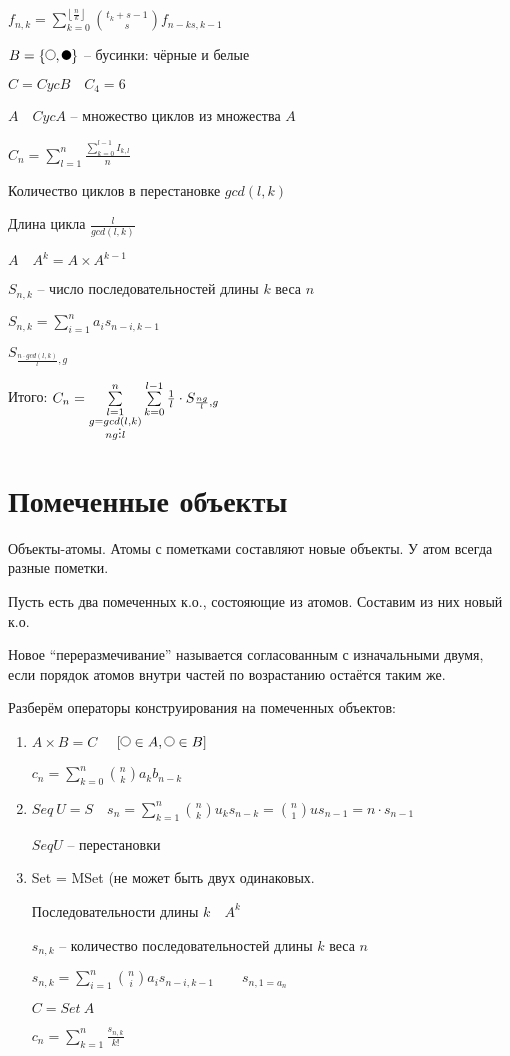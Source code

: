 \documentclass{book}
\theoremstyle{definition}
\begin{document}
$f_{n,k} = \sum_{k=0}^{\left\lfloor \frac{n}{k} \right\rfloor} {{t_k+s-1} \choose s}f_{n-ks,k-1}$


$B = \{\tikz \draw (0,0) circle [radius=.12];, \tikz \fill[black] (0,0) circle [radius=.12];\}$ -- бусинки: чёрные и белые 

$C = Cyc B\quad C_4 = 6$

$A\quad Cyc A$ -- множество циклов из множества  $A$

$C_n = \sum_{l=1}^{n} \frac{\sum_{k=0}^{l-1} I_{k,l}}{n}$ 

Количество циклов в перестановке $gcd(l,k)$

Длина цикла $\frac{l}{gcd(l,k)}$


$A\quad A^k = A\times A^{k-1}$

$S_{n,k}$ -- число последовательностей длины  $k$ веса  $n$

$S_{n,k} = \sum_{i=1}^{n} a_is_{n-i, k-1}$ 

$S_{\frac{n\cdot gcd(l,k)}{l}, g}$ 

Итого: $C_n = \sum\limits_{\substack{l=1\\g = gcd(l,k)\\ ng  \mathrel{\vbox{\baselineskip.65ex\lineskiplimit0pt\hbox{.}\hbox{.}\hbox{.}}} l}}^{n} \sum_{k=0}^{l-1} \frac{1}{l}\cdot S_{\frac{ng}{l}, g} $
\section{Помеченные объекты}

Объекты-атомы. Атомы с пометками составляют новые объекты. У атом всегда разные пометки.

Пусть есть два помеченных к.о., состояющие из атомов. Составим из них новый к.о.

Новое ``переразмечивание'' называется согласованным с изначальными двумя, если порядок атомов внутри частей по возрастанию остаётся таким же.

Разберём операторы конструирования на помеченных объектов:
\begin{enumerate}
    \item $A\times B = C\quad $ $\left[ \tikz \draw (0,0) circle [radius=.12];\in A, \tikz \draw (0,0) circle [radius=.12];\in B\right]$

        $c_n = \sum_{k=0}^{n} {n\choose k} a_kb_{n-k}$ 
    \item $Seq~U = S\quad s_n = \sum_{k=1}^{n} {n\choose k}u_ks_{n-k} = {n \choose 1}us_{n-1} = n\cdot s_{n-1}$ 

        $Seq U$ -- перестановки
    \item Set = MSet (не может быть двух одинаковых. 

        Последовательности длины $k\quad A^k$

        $s_{n,k}$ -- количество последовательностей длины  $k$ веса  $n$

        $ s_{n,k} = \sum_{i=1}^{n} {n\choose i}a_is_{n-i, k-1}\qquad s_{n,1 = a_n} $ 

         $C = Set~A$

         $c_n = \sum_{k=1}^{n} \frac{s_{n, k}}{k!}$
\end{enumerate}
\end{document}
